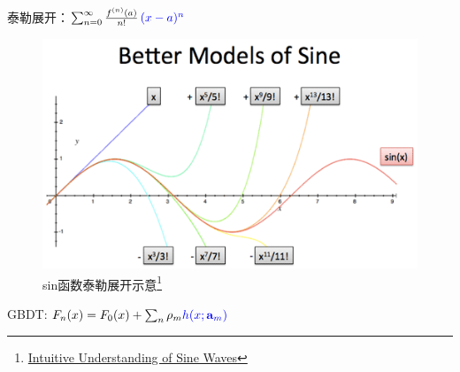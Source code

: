 \begin{frame}
    泰勒展开：$\sum _{n=0}^{\infty }{\frac{f^{(n)}(a)}{n!}}\,\textcolor{blue}{(x-a)^{n}}$

    \begin{figure}[!tb]
        \includegraphics[width=\twopicwidth]{figure/gbdt/sine-better-models}
        \caption{sin函数泰勒展开示意\footnote{
                 \href{https://betterexplained.com/articles/intuitive-understanding-of-sine-waves/}{Intuitive Understanding of Sine Waves}}}
    \end{figure}

    GBDT: $F_n(x) = F_{0}(x) + \sum_n \rho_m \textcolor{blue}{h(x; \mathbf{a}_m)}$
\end{frame}


%


